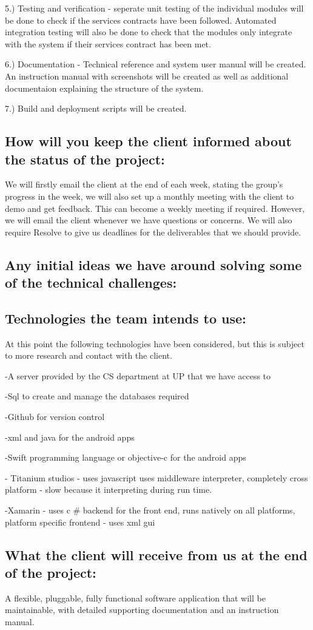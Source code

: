 \documentclass[hidelinks, 12pt, oneside]{article}
\begin{document}
5.) Testing and verification - seperate unit testing of the individual modules will be done to check if the services contracts have been followed. Automated integration testing will also be done to check that the modules only integrate with the system if their services contract has been met. 

6.) Documentation - Technical reference and system user manual will be created. An instruction manual with screenshots will be created as well as additional documentaion explaining the structure of the system.  

7.) Build and deployment scripts will be created. 

\subsection{How will you keep the client informed about the status of the project:}

We will firstly email the client at the end of each  week, stating the group's progress in the week, we will also set up a monthly meeting with the client to demo and get feedback. This can become a weekly meeting if required. However, we will email the client whenever we have questions or concerns. We will also require Resolve to give us deadlines for the deliverables that we should provide. 

\subsection{Any initial ideas we have around solving some of the technical challenges:}



\subsection{Technologies the team intends to use: }
 

At this point the following technologies have been considered, but this is subject to more research and contact with the client. 

-A server provided by the CS department at UP that we have access to

-Sql to create and manage the databases required 

-Github for version control 
 
-xml and java for the android apps

-Swift programming language or objective-c for the android apps

- Titanium studios - uses javascript uses middleware interpreter, completely cross platform - slow because it interpreting during run time. 

-Xamarin - uses c # backend for the front end, runs natively on all platforms, platform specific frontend - uses xml gui 


\subsection{What the client will receive from us at the end of the project:}

A flexible, pluggable, fully functional software application  that will be maintainable, with detailed supporting documentation and an instruction manual.
\end{document}
